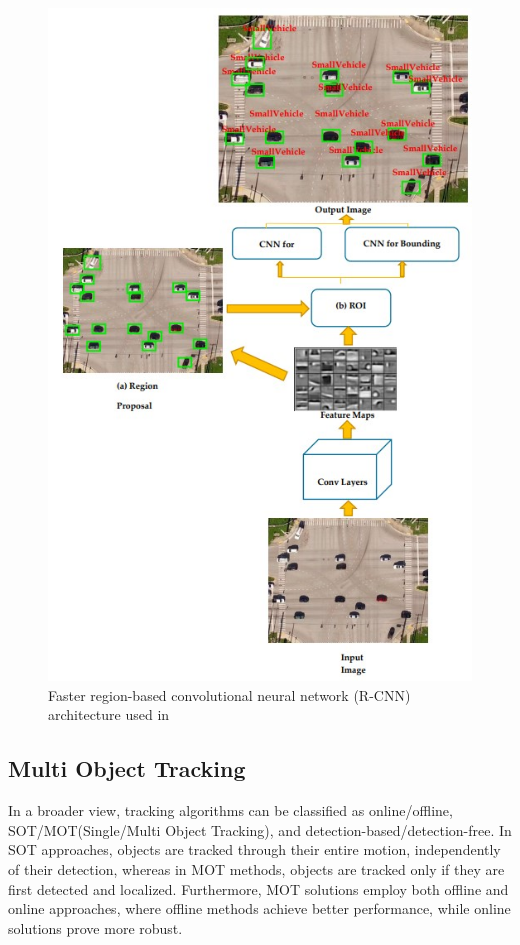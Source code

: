 \documentclass[10pt,twocolumn,letterpaper]{article}  %
\begin{document}
\begin{figure}[!t]
	\centering
	\includegraphics[width=0.95\linewidth]{./figures/biswas2019speed_FasterRCNN_workflow.jpg} %
	\caption{Faster region-based convolutional neural network (R-CNN) architecture used in \cite{biswas2019speed}}
	\label{fig:biswas2019speed_FasterRCNN_workflow}
\end{figure}

\subsection{Multi Object Tracking}
In a broader view, tracking algorithms can be classified as online/offline, SOT/MOT(Single/Multi Object Tracking), and detection-based/detection-free. In SOT approaches, objects are tracked through their entire motion, independently of their detection, whereas in MOT methods, objects are tracked only if they are first detected and localized. Furthermore, MOT solutions employ both offline and online approaches, where offline methods achieve better performance, while online solutions prove more robust. 
\end{document}
